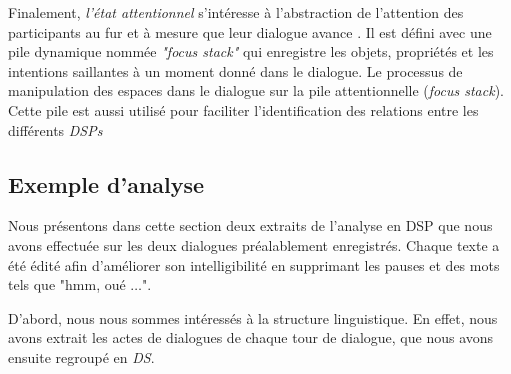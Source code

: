 			
			Finalement, \emph{l'état attentionnel} s'intéresse à l'abstraction de l'attention des participants au fur et à mesure que leur dialogue avance \cite{sidner1994artificial}. Il est défini avec une pile dynamique nommée \emph{"focus stack"} qui enregistre les objets, propriétés et les intentions saillantes  à un moment donné dans le dialogue. Le processus de manipulation des espaces dans le dialogue sur la pile attentionnelle (\emph{focus stack}). Cette pile est aussi utilisé pour faciliter l'identification des relations entre les différents \emph{DSPs}
			

		 \subsection{Exemple d'analyse}
			 Nous présentons dans cette section deux extraits de l'analyse en DSP que nous avons effectuée sur les deux dialogues préalablement enregistrés. Chaque texte a été édité afin d'améliorer son intelligibilité en supprimant les pauses et des mots tels que "hmm, oué $\ldots$".
			 
			 D'abord, nous nous sommes intéressés à la structure linguistique. En effet, nous avons extrait les actes de dialogues de chaque tour de dialogue, que nous avons ensuite regroupé en \emph{DS}. 
			
